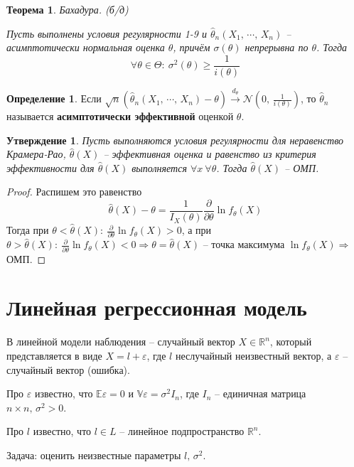 \documentclass[a4paper,12pt]{article}
\renewcommand{\geq}{\ensuremath{\geqslant}}
\theoremstyle{plain}
\newtheorem{theorem}{Теорема}[section]
\newtheorem{proposition}{Утверждение}[section]
\theoremstyle{definition}
\newtheorem{definition}{Определение}[section]
\theoremstyle{remark}
\begin{document}
\begin{theorem}
  Бахадура. (б/д)

  Пусть выполнены условия регулярности 1-9 и $\hat{\theta}_n(X_1,\,\cdots,\,X_n)$ -- асимптотически нормальная оценка $\theta$, причём $\sigma(\theta)$ непрерывна по $\theta$. Тогда 
  \[
    \forall \theta \in \Theta :\: \sigma^2(\theta) \geq \frac{1}{i(\theta)}
  \]
\end{theorem}

\begin{definition}
  Если $\sqrt{n}(\hat{\theta}_n(X_1,\,\cdots,\,X_n) - \theta) \overset{d_\theta}{\to} \mathcal{N}(0,\, \frac{1}{i(\theta)})$, то $\hat{\theta}_n$ называется \textbf{асимптотически эффективной} оценкой $\theta$.
\end{definition}

\begin{proposition}
  Пусть выполняются условия регулярности для неравенство Крамера-Рао, $\hat{\theta}(X)$ -- эффективная оценка и равенство из критерия эффективности для $\hat{\theta}(X)$ выполняется $\forall x \: \forall \theta$. Тогда $\hat{\theta}(X)$ -- ОМП. 
\end{proposition}

\begin{proof}
  Распишем это равенство
  \[
    \hat{\theta}(X) - \theta = \frac{1}{I_X(\theta)}\frac{\partial}{\partial\theta}\ln f_\theta(X)
  \]
  Тогда при $\theta < \hat{\theta}(X) :\: \frac{\partial}{\partial\theta}\ln f_\theta(X) > 0$, а при $\theta > \hat{\theta}(X) :\: \frac{\partial}{\partial\theta}\ln f_\theta(X) < 0 \Rightarrow \theta = \hat{\theta}(X)$ -- точка максимума $\ln f_\theta(X) \Rightarrow$ ОМП.
\end{proof}

\section{Линейная регрессионная модель}
В линейной модели наблюдения -- случайный вектор $X \in \mathbb{R}^n$, который представляется в виде $X = l + \varepsilon$, где $l$ неслучайный неизвестный вектор, а $\varepsilon$ -- случайный вектор (ошибка).

Про $\varepsilon$ известно, что $\mathbb{E}\varepsilon = 0$ и $\mathbb{V}\varepsilon = \sigma^2I_n$, где $I_n$ -- единичная матрица $n \times n,\, \sigma^2 > 0$.

Про $l$ известно, что $l \in L$ -- линейное подпространство $\mathbb{R}^n$.

Задача: оценить неизвестные параметры $l,\, \sigma^2$.
\end{document}
